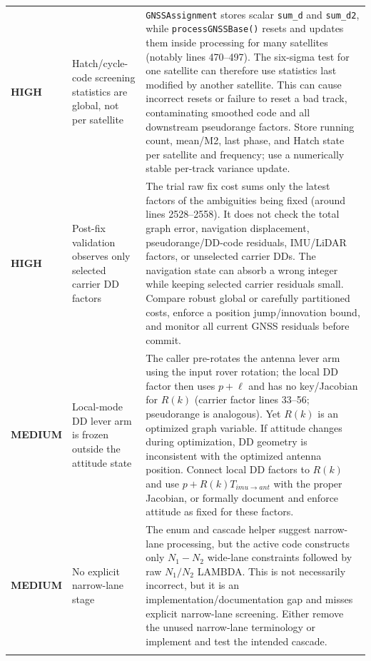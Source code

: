 \documentclass[11pt,a4paper]{article}
\newcommand{\code}[1]{\texttt{#1}}
\newcommand{\high}{\textcolor{red!75!black}{\textbf{HIGH}}}
\newcommand{\medium}{\textcolor{orange!85!black}{\textbf{MEDIUM}}}
\begin{document}
\begin{longtable}{>{\raggedright\arraybackslash}p{18mm}p{43mm}p{93mm}}
\high & Hatch/cycle-code screening statistics are global, not per satellite &
\code{GNSSAssignment} stores scalar \code{sum\_d} and \code{sum\_d2}, while
\code{processGNSSBase()} resets and updates them inside processing for many
satellites (notably lines 470--497).  The six-sigma test for one satellite can
therefore use statistics last modified by another satellite.  This can cause
incorrect resets or failure to reset a bad track, contaminating smoothed code
and all downstream pseudorange factors.  Store running count, mean/M2, last
phase, and Hatch state per satellite and frequency; use a numerically stable
per-track variance update. \\
\addlinespace

\high & Post-fix validation observes only selected carrier DD factors &
The trial raw fix cost sums only the latest factors of the ambiguities being
fixed (around lines 2528--2558).  It does not check the total graph error,
navigation displacement, pseudorange/DD-code residuals, IMU/LiDAR factors, or
unselected carrier DDs.  The navigation state can absorb a wrong integer while
keeping selected carrier residuals small.  Compare robust global or carefully
partitioned costs, enforce a position jump/innovation bound, and monitor all
current GNSS residuals before commit. \\
\addlinespace

\medium & Local-mode DD lever arm is frozen outside the attitude state &
The caller pre-rotates the antenna lever arm using the input rover rotation;
the local DD factor then uses $p+\ell$ and has no key/Jacobian for $R(k)$
(carrier factor lines 33--56; pseudorange is analogous).  Yet $R(k)$ is an
optimized graph variable.  If attitude changes during optimization, DD geometry
is inconsistent with the optimized antenna position.  Connect local DD factors
to $R(k)$ and use $p+R(k)T_{imu\rightarrow ant}$ with the proper Jacobian, or
formally document and enforce attitude as fixed for these factors. \\
\addlinespace

\medium & No explicit narrow-lane stage &
The enum and cascade helper suggest narrow-lane processing, but the active code
constructs only $N_1-N_2$ wide-lane constraints followed by raw $N_1/N_2$
LAMBDA.  This is not necessarily incorrect, but it is an implementation/documentation
gap and misses explicit narrow-lane screening.  Either remove the unused
narrow-lane terminology or implement and test the intended cascade. \\
\addlinespace


\end{longtable}
\end{document}
